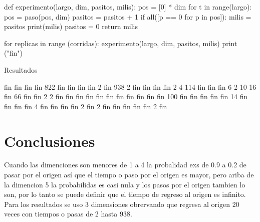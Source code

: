 \documentclass{article}
\begin{document}
    

def experimento(largo, dim, pasitos, milis):
    pos = [0] * dim
    for t in range(largo):
        pos = paso(pos, dim)
        pasitos = pasitos + 1
        if  all([p == 0 for p in pos]):
            milis = pasitos
            print(milis)
            pasitos = 0
            return milis


  

for replicas in range (corridas):
experimento(largo, dim, pasitos, milis)
print ("fin")

Resultados

fin
fin
fin
fin
822
fin
fin
fin
fin
2
fin
938
2
fin
fin
fin
fin
2
4
114
fin
fin
fin
6
2
10
16
fin
66
fin
fin
2
2
fin
fin
fin
fin
fin
fin
fin
fin
fin
fin
fin
100
fin
fin
fin
fin
fin
14
fin
fin
fin
fin
4
fin
fin
fin
fin
2
fin
2
fin
fin
fin
fin
fin
2
fin


\section{Conclusiones}
Cuando las dimenciones son menores de 1 a 4 la probalidad exs de 0.9 a 0.2 de pasar por el origen as\'{i} que el tiempo o paso por el origen es mayor, pero ariba de la dimencion 5 la probabilidas es casi nula y los pasos por el origen tambien lo son, por lo tanto se puede definir que el tiempo de regreso al origen es infinito. Para los resultados se uso 3 dimensiones obrervando que regresa al origen 20 veces con tiempos o pasas de 2 hasta 938.
\end{document}
